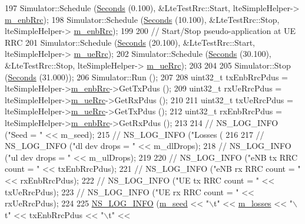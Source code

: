\begin{DoxyCode}
197   Simulator::Schedule (\hyperlink{group__timecivil_ga33c34b816f8ff6628e33d5c8e9713b9e}{Seconds} (0.100), &LteTestRrc::Start, lteSimpleHelper->
      \hyperlink{classns3_1_1LteSimpleHelper_a89ce7ea3468b4cbea029490a6451052e}{m\_enbRrc});
198   Simulator::Schedule (\hyperlink{group__timecivil_ga33c34b816f8ff6628e33d5c8e9713b9e}{Seconds} (10.100), &LteTestRrc::Stop, lteSimpleHelper->
      \hyperlink{classns3_1_1LteSimpleHelper_a89ce7ea3468b4cbea029490a6451052e}{m\_enbRrc});
199 
200   \textcolor{comment}{// Start/Stop pseudo-application at UE RRC}
201   Simulator::Schedule (\hyperlink{group__timecivil_ga33c34b816f8ff6628e33d5c8e9713b9e}{Seconds} (20.100), &LteTestRrc::Start, lteSimpleHelper->
      \hyperlink{classns3_1_1LteSimpleHelper_a21a115de62aaa22c3278c1154057b5f2}{m\_ueRrc});
202   Simulator::Schedule (\hyperlink{group__timecivil_ga33c34b816f8ff6628e33d5c8e9713b9e}{Seconds} (30.100), &LteTestRrc::Stop, lteSimpleHelper->
      \hyperlink{classns3_1_1LteSimpleHelper_a21a115de62aaa22c3278c1154057b5f2}{m\_ueRrc});
203 
204 
205   Simulator::Stop (\hyperlink{group__timecivil_ga33c34b816f8ff6628e33d5c8e9713b9e}{Seconds} (31.000));
206   Simulator::Run ();
207 
208   uint32\_t txEnbRrcPdus = lteSimpleHelper->\hyperlink{classns3_1_1LteSimpleHelper_a89ce7ea3468b4cbea029490a6451052e}{m\_enbRrc}->GetTxPdus ();
209   uint32\_t rxUeRrcPdus = lteSimpleHelper->\hyperlink{classns3_1_1LteSimpleHelper_a21a115de62aaa22c3278c1154057b5f2}{m\_ueRrc}->GetRxPdus ();
210 
211   uint32\_t txUeRrcPdus = lteSimpleHelper->\hyperlink{classns3_1_1LteSimpleHelper_a21a115de62aaa22c3278c1154057b5f2}{m\_ueRrc}->GetTxPdus ();
212   uint32\_t rxEnbRrcPdus = lteSimpleHelper->\hyperlink{classns3_1_1LteSimpleHelper_a89ce7ea3468b4cbea029490a6451052e}{m\_enbRrc}->GetRxPdus ();
213 
214   \textcolor{comment}{// NS\_LOG\_INFO ("Seed = " << m\_seed);}
215   \textcolor{comment}{// NS\_LOG\_INFO ("Losses (%
216 
217   \textcolor{comment}{// NS\_LOG\_INFO ("dl dev drops = " << m\_dlDrops);}
218   \textcolor{comment}{// NS\_LOG\_INFO ("ul dev drops = " << m\_ulDrops);}
219 
220   \textcolor{comment}{// NS\_LOG\_INFO ("eNB tx RRC count = " << txEnbRrcPdus);}
221   \textcolor{comment}{// NS\_LOG\_INFO ("eNB rx RRC count = " << rxEnbRrcPdus);}
222   \textcolor{comment}{// NS\_LOG\_INFO ("UE tx RRC count = " << txUeRrcPdus);}
223   \textcolor{comment}{// NS\_LOG\_INFO ("UE rx RRC count = " << rxUeRrcPdus);}
224 
225   \hyperlink{group__logging_gafbd73ee2cf9f26b319f49086d8e860fb}{NS\_LOG\_INFO} (\hyperlink{classLteRlcUmE2eTestCase_a4efdc34bf54ce1409c1176bdb5ee5d08}{m\_seed} << \textcolor{stringliteral}{"\(\backslash\)t"} << \hyperlink{classLteRlcUmE2eTestCase_a1d6de8677532b47d1b7fd61d2081bb30}{m\_losses} << \textcolor{stringliteral}{"\(\backslash\)t"} << txEnbRrcPdus << \textcolor{stringliteral}{"\(\backslash\)t"} << 
}
\end{DoxyCode}
